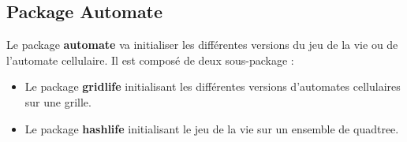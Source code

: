 \subsection{Package Automate}

\par Le package \textbf{automate} va initialiser les différentes versions du jeu de la vie ou de l'automate cellulaire. Il est composé de deux sous-package : \begin{itemize}
    \item Le package \textbf{gridlife} initialisant les différentes versions d'automates cellulaires sur une grille.
    \item Le package \textbf{hashlife} initialisant le jeu de la vie sur un ensemble de quadtree.
\end{itemize}


